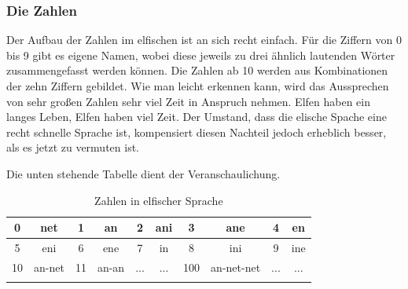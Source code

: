 \subsubsection{Die Zahlen}
\par Der Aufbau der Zahlen im elfischen ist an sich recht einfach.
Für die Ziffern von 0 bis 9 gibt es eigene Namen, wobei diese
jeweils zu drei ähnlich lautenden Wörter zusammengefasst werden
können. Die Zahlen ab 10 werden aus Kombinationen der zehn Ziffern
gebildet. Wie man leicht erkennen kann, wird das Aussprechen von
sehr großen Zahlen sehr viel Zeit in Anspruch nehmen. Elfen haben
ein langes Leben, Elfen haben viel Zeit. Der Umstand, dass die
elische Spache eine recht schnelle Sprache ist, kompensiert diesen
Nachteil jedoch erheblich besser, als es jetzt zu vermuten ist.
\par Die unten stehende Tabelle dient der Veranschaulichung.
\begin{longtable}{c|c|c|c|c|c|c|c|c|c}
0 &  net &1  & an &2  & ani &3 &  ane &4& en\\
\hline
5  & eni &6  & ene &7  & in &8 &ini &9 &ine\\
\hline
10 & an-net& 11&  an-an & $...$ & $...$ &100& an-net-net& $...$ & $...$ \\
\caption{Zahlen in elfischer Sprache}
\end{longtable}
